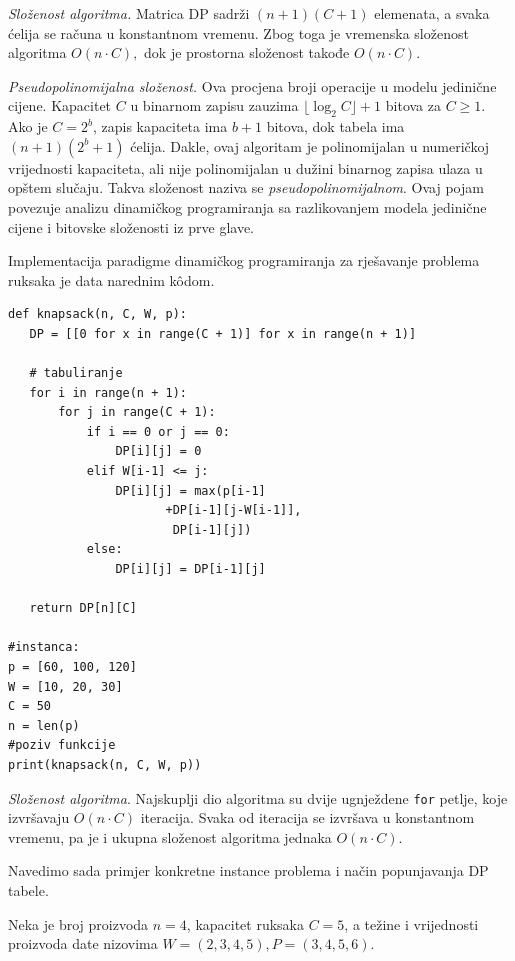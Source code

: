 \begin{solution}
	\medskip
	
	\textit{Složenost algoritma.}  Matrica $\textrm{DP}$ sadrži $(n+1)(C+1)$ elemenata, a svaka ćelija se računa u konstantnom vremenu. Zbog toga je vremenska složenost algoritma $ O(n \cdot C),$ dok je prostorna složenost takođe $O(n \cdot C).$

\textit{Pseudopolinomijalna složenost.} Ova procjena broji operacije u modelu jedinične cijene. Kapacitet $C$ u binarnom zapisu zauzima $\lfloor\log_2 C\rfloor+1$ bitova za $C\geq 1$. Ako je $C=2^b$, zapis kapaciteta ima $b+1$ bitova, dok tabela ima $(n+1)(2^b+1)$ ćelija. Dakle, ovaj algoritam je polinomijalan u numeričkoj vrijednosti kapaciteta, ali nije polinomijalan u dužini binarnog zapisa ulaza u opštem slučaju. Takva složenost naziva se \textit{pseudopolinomijalnom}. Ovaj pojam povezuje analizu dinamičkog programiranja sa razlikovanjem modela jedinične cijene i bitovske složenosti iz prve glave.
	
\end{solution}
	 
	 Implementacija paradigme dinamičkog programiranja za rješavanje pro\-blema ruksaka je data narednim k\^odom.
	 
	 \begin{verbatim}
def knapsack(n, C, W, p):
   DP = [[0 for x in range(C + 1)] for x in range(n + 1)]

   # tabuliranje
   for i in range(n + 1):
       for j in range(C + 1):
           if i == 0 or j == 0:
               DP[i][j] = 0
           elif W[i-1] <= j:
               DP[i][j] = max(p[i-1]
                      +DP[i-1][j-W[i-1]],
                       DP[i-1][j])
           else:
               DP[i][j] = DP[i-1][j]

   return DP[n][C]

#instanca:
p = [60, 100, 120]
W = [10, 20, 30]
C = 50
n = len(p)
#poziv funkcije
print(knapsack(n, C, W, p))
\end{verbatim}
	 
 \textit{Složenost algoritma}. Najskuplji dio algoritma su dvije ugnježdene \texttt{for} petlje, koje izvršavaju $O(n \cdot C)$ iteracija. Svaka od iteracija se izvršava u konstantnom vremenu, pa je i ukupna složenost algoritma jednaka $O(n \cdot C)$.


Navedimo sada primjer konkretne instance problema i način popunjavanja DP tabele.

Neka je broj proizvoda $n=4$, kapacitet ruksaka $C=5$, a težine i vrijednosti proizvoda date nizovima $W=(2,3,4,5), P=(3,4,5,6).$

